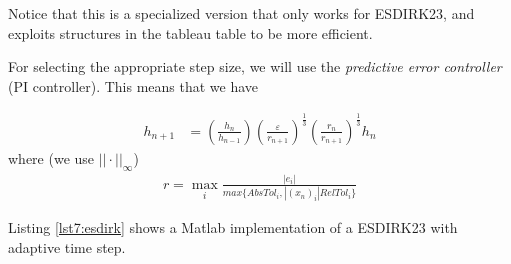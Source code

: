 Notice that this is a specialized version that only works for ESDIRK23, and exploits structures in the tableau table to be more efficient.

For selecting the appropriate step size, we will use the \textit{predictive error controller} (PI controller). This means that we have

\begin{align}
    h_{n+1} &= \left ( \frac{h_n}{h_{n-1}}  \right )
    \left ( \frac{\varepsilon}{r_{n+1}} \right )^{\frac{1}{3}} 
    \left ( \frac{r_n}{r_{n+1}} \right )^{\frac{1}{3}} h_n
\end{align}
where (we use $||\cdot ||_\infty$)
\begin{align}
    r = \max_i \frac{|e_i|}{max \{AbsTol_i, |(x_n)_i| RelTol_i\} }
\end{align}

Listing \ref{lst7:esdirk} shows a Matlab implementation of a ESDIRK23 with adaptive time step.

